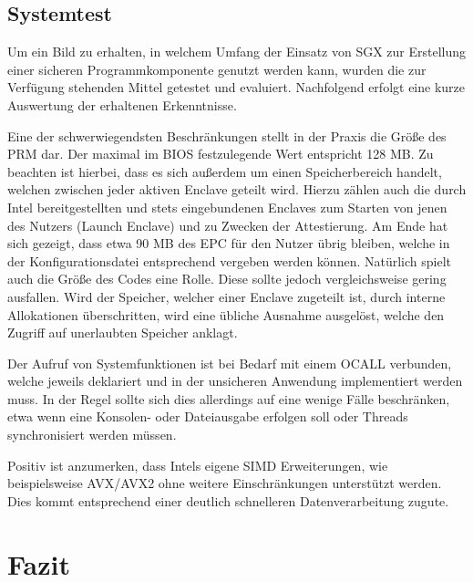 \subsection{Systemtest}

Um ein Bild zu erhalten, in welchem Umfang der Einsatz von SGX zur Erstellung einer sicheren Programmkomponente genutzt werden kann, wurden die zur Verfügung stehenden Mittel getestet und evaluiert. Nachfolgend erfolgt eine kurze Auswertung der erhaltenen Erkenntnisse.

Eine der schwerwiegendsten Beschränkungen stellt in der Praxis die Größe des PRM dar. Der maximal im BIOS festzulegende Wert entspricht 128 MB. Zu beachten ist hierbei, dass es sich außerdem um einen Speicherbereich handelt, welchen zwischen jeder aktiven Enclave geteilt wird. Hierzu zählen auch die durch Intel bereitgestellten und stets eingebundenen Enclaves zum Starten von jenen des Nutzers (Launch Enclave) und zu Zwecken der Attestierung. Am Ende hat sich gezeigt, dass etwa 90 MB des EPC für den Nutzer übrig bleiben, welche in der Konfigurationsdatei entsprechend vergeben werden können. Natürlich spielt auch die Größe des Codes eine Rolle. Diese sollte jedoch vergleichsweise gering ausfallen. Wird der Speicher, welcher einer Enclave zugeteilt ist, durch interne Allokationen überschritten, wird eine übliche Ausnahme ausgelöst, welche den Zugriff auf unerlaubten Speicher anklagt.

Der Aufruf von Systemfunktionen ist bei Bedarf mit einem OCALL verbunden, welche jeweils deklariert und in der unsicheren Anwendung implementiert werden muss. In der Regel sollte sich dies allerdings auf eine wenige Fälle beschränken, etwa wenn eine Konsolen- oder Dateiausgabe erfolgen soll oder Threads synchronisiert werden müssen.

Positiv ist anzumerken, dass Intels eigene SIMD Erweiterungen, wie beispielsweise AVX/AVX2 ohne weitere Einschränkungen unterstützt werden. Dies kommt entsprechend einer deutlich schnelleren Datenverarbeitung zugute.

\section{Fazit}

